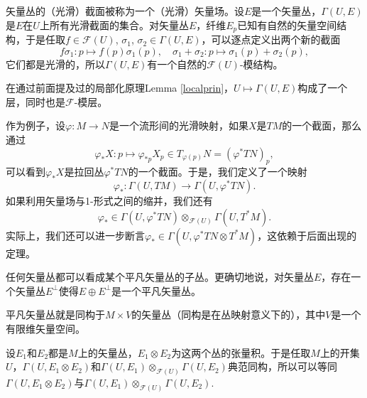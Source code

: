 \begin{para}[矢量丛的截面]
矢量丛的（光滑）截面被称为一个（光滑）矢量场。设$E$是一个矢量丛，$\Gamma(U,E)$是$E$在$U$上所有光滑截面的集合。对矢量丛$E$，纤维$E_p$已知有自然的矢量空间结构，于是任取$f\in \mathcal{F}(U)$, $\sigma_1$, $\sigma_2\in \Gamma(U,E)$，可以逐点定义出两个新的截面
\[
	f\sigma_1:p\mapsto f(p)\sigma_1(p),\quad \sigma_1+\sigma_2:p\mapsto \sigma_1(p)+\sigma_2(p),
\]
它们都是光滑的，所以$\Gamma(U,E)$有一个自然的$\mathcal{F}(U)$-模结构。
\end{para}

在通过前面提及过的局部化原理Lemma \ref{localprin}，$U\mapsto \Gamma(U,E)$构成了一个层，同时也是$\mathcal{F}$-模层。

\begin{para}
作为例子，设$\varphi:M\to N$是一个流形间的光滑映射，如果$X$是$TM$的一个截面，那么通过
\[
	\varphi_* X:p\mapsto \varphi_{*p}X_p\in T_{\varphi(p)}N=(\varphi^*TN)_p,
\]
可以看到$\varphi_* X$是拉回丛$\varphi^*TN$的一个截面。于是，我们定义了一个映射
\[
	\varphi_*:\Gamma(U,TM)\to \Gamma(U,\varphi^*TN).
\]
如果利用矢量场与1-形式之间的缩并，我们还有
\[
	\varphi_*\in \Gamma(U,\varphi^*TN)\otimes_{\mathcal{F}(U)} \Gamma(U,T^*M).
\]
实际上，我们还可以进一步断言$\varphi_*\in \Gamma(U,\varphi^*TN\otimes T^*M)$，这依赖于后面出现的定理。
\end{para}


\begin{pro}
任何矢量丛都可以看成某个平凡矢量丛的子丛。更确切地说，对矢量丛$E$，存在一个矢量丛$E^\bot$使得$E\oplus E^\bot$是一个平凡矢量丛。
\end{pro}

平凡矢量丛就是同构于$M\times V$的矢量丛（同构是在丛映射意义下的），其中$V$是一个有限维矢量空间。

\begin{thm}
设$E_1$和$E_2$都是$M$上的矢量丛，$E_1\otimes E_2$为这两个丛的张量积。于是任取$M$上的开集$U$，$\Gamma(U,E_1\otimes E_2)$和$\Gamma(U,E_1)\otimes_{\mathcal{F}(U)} \Gamma(U,E_2)$典范同构，所以可以等同$\Gamma(U,E_1\otimes E_2)$与$\Gamma(U,E_1)\otimes_{\mathcal{F}(U)} \Gamma(U,E_2)$.
\end{thm}


